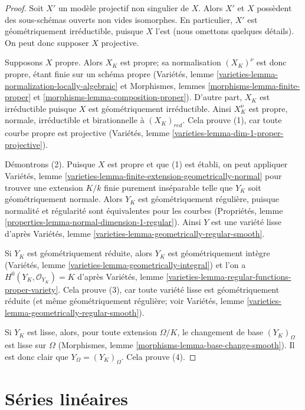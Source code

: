 \begin{proof}
Soit $X'$ un modèle projectif non singulier de $X$. Alors $X'$ et $X$ possèdent des sous-schémas ouverts non vides isomorphes. En particulier, $X'$ est géométriquement irréductible, puisque $X$ l'est (nous omettons quelques détails). On peut donc supposer $X$ projective.

\medskip\noindent
Supposons $X$ propre. Alors $X_K$ est propre; sa normalisation $(X_K)^\nu$ est donc propre, étant finie sur un schéma propre (Variétés, lemme \ref{varieties-lemma-normalization-locally-algebraic} et Morphismes, lemmes \ref{morphisms-lemma-finite-proper} et \ref{morphisms-lemma-composition-proper}). D'autre part, $X_K$ est irréductible puisque $X$ est géométriquement irréductible. Ainsi $X_K^\nu$ est propre, normale, irréductible et birationnelle à $(X_K)_{red}$. Cela prouve (1), car toute courbe propre est projective (Variétés, lemme \ref{varieties-lemma-dim-1-proper-projective}).

\medskip\noindent
Démontrons (2). Puisque $X$ est propre et que (1) est établi, on peut appliquer Variétés, lemme \ref{varieties-lemma-finite-extension-geometrically-normal} pour trouver une extension $K/k$ finie purement inséparable telle que $Y_K$ soit géométriquement normale. Alors $Y_K$ est géométriquement régulière, puisque normalité et régularité sont équivalentes pour les courbes (Propriétés, lemme \ref{properties-lemma-normal-dimension-1-regular}). Ainsi $Y$ est une variété lisse d'après Variétés, lemme \ref{varieties-lemma-geometrically-regular-smooth}.

\medskip\noindent
Si $Y_K$ est géométriquement réduite, alors $Y_K$ est géométriquement intègre (Variétés, lemme \ref{varieties-lemma-geometrically-integral}) et l'on a $H^0(Y_K, \mathcal{O}_{Y_K}) = K$ d'après Variétés, lemme \ref{varieties-lemma-regular-functions-proper-variety}. Cela prouve (3), car toute variété lisse est géométriquement réduite (et même géométriquement régulière; voir Variétés, lemme \ref{varieties-lemma-geometrically-regular-smooth}).

\medskip\noindent
Si $Y_K$ est lisse, alors, pour toute extension $\Omega/K$, le changement de base $(Y_K)_\Omega$ est lisse sur $\Omega$ (Morphismes, lemme \ref{morphisms-lemma-base-change-smooth}). Il est donc clair que $Y_\Omega = (Y_K)_\Omega$. Cela prouve (4).
\end{proof}






\section{Séries linéaires}
\label{section-linear-series}

